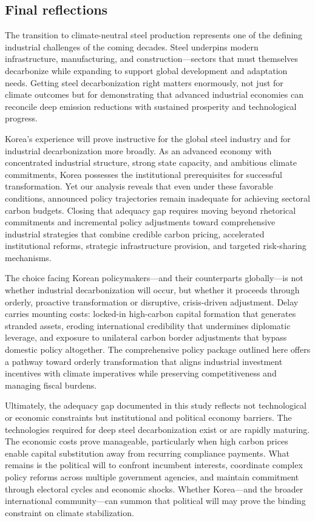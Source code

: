 \documentclass[preprint,1p,authoryear]{elsarticle}
\begin{document}
\subsection{Final reflections}

The transition to climate-neutral steel production represents one of the defining industrial challenges of the coming decades. Steel underpins modern infrastructure, manufacturing, and construction—sectors that must themselves decarbonize while expanding to support global development and adaptation needs. Getting steel decarbonization right matters enormously, not just for climate outcomes but for demonstrating that advanced industrial economies can reconcile deep emission reductions with sustained prosperity and technological progress.

Korea's experience will prove instructive for the global steel industry and for industrial decarbonization more broadly. As an advanced economy with concentrated industrial structure, strong state capacity, and ambitious climate commitments, Korea possesses the institutional prerequisites for successful transformation. Yet our analysis reveals that even under these favorable conditions, announced policy trajectories remain inadequate for achieving sectoral carbon budgets. Closing that adequacy gap requires moving beyond rhetorical commitments and incremental policy adjustments toward comprehensive industrial strategies that combine credible carbon pricing, accelerated institutional reforms, strategic infrastructure provision, and targeted risk-sharing mechanisms.

The choice facing Korean policymakers—and their counterparts globally—is not whether industrial decarbonization will occur, but whether it proceeds through orderly, proactive transformation or disruptive, crisis-driven adjustment. Delay carries mounting costs: locked-in high-carbon capital formation that generates stranded assets, eroding international credibility that undermines diplomatic leverage, and exposure to unilateral carbon border adjustments that bypass domestic policy altogether. The comprehensive policy package outlined here offers a pathway toward orderly transformation that aligns industrial investment incentives with climate imperatives while preserving competitiveness and managing fiscal burdens.

Ultimately, the adequacy gap documented in this study reflects not technological or economic constraints but institutional and political economy barriers. The technologies required for deep steel decarbonization exist or are rapidly maturing. The economic costs prove manageable, particularly when high carbon prices enable capital substitution away from recurring compliance payments. What remains is the political will to confront incumbent interests, coordinate complex policy reforms across multiple government agencies, and maintain commitment through electoral cycles and economic shocks. Whether Korea—and the broader international community—can summon that political will may prove the binding constraint on climate stabilization.
\end{document}
